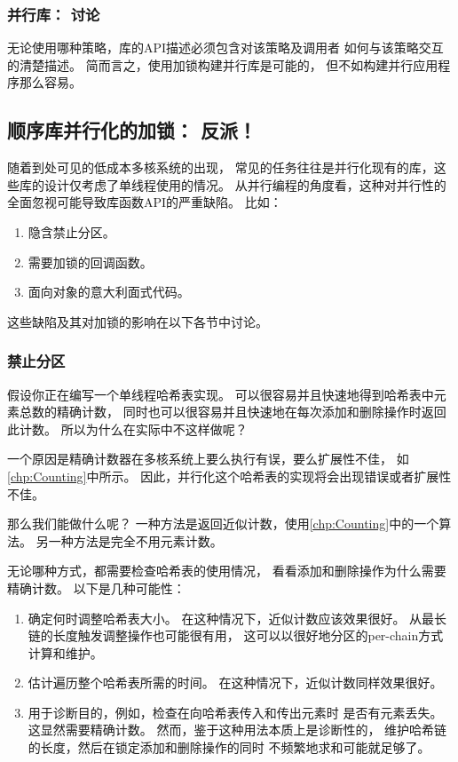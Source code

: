 \subsubsection{并行库：
				   讨论}
\label{sec:locking:Parallel Libraries: Discussion}

无论使用哪种策略，库的API描述必须包含对该策略及调用者
如何与该策略交互的清楚描述。
简而言之，使用加锁构建并行库是可能的，
但不如构建并行应用程序那么容易。

\subsection{顺序库并行化的加锁：
							    反派！}
\label{sec:locking:Locking For Parallelizing Sequential Libraries: Villain!}

随着到处可见的低成本多核系统的出现，
常见的任务往往是并行化现有的库，这些库的设计仅考虑了单线程使用的情况。
从并行编程的角度看，这种对并行性的全面忽视可能导致库函数API的严重缺陷。
比如：

\begin{enumerate}
\item	隐含禁止分区。
\item	需要加锁的回调函数。
\item	面向对象的意大利面式代码。
\end{enumerate}

这些缺陷及其对加锁的影响在以下各节中讨论。

\subsubsection{禁止分区}
\label{sec:locking:Partitioning Prohibited}

假设你正在编写一个单线程哈希表实现。
可以很容易并且快速地得到哈希表中元素总数的精确计数，
同时也可以很容易并且快速地在每次添加和删除操作时返回此计数。
所以为什么在实际中不这样做呢？

一个原因是精确计数器在多核系统上要么执行有误，要么扩展性不佳，
如\cref{chp:Counting}中所示。
因此，并行化这个哈希表的实现将会出现错误或者扩展性不佳。

那么我们能做什么呢？
一种方法是返回近似计数，使用\cref{chp:Counting}中的一个算法。
另一种方法是完全不用元素计数。

无论哪种方式，都需要检查哈希表的使用情况，
看看添加和删除操作为什么需要精确计数。
以下是几种可能性：

\begin{enumerate}
\item	确定何时调整哈希表大小。
	在这种情况下，近似计数应该效果很好。
	从最长链的长度触发调整操作也可能很有用，
	这可以以很好地分区的per-chain方式计算和维护。
\item	估计遍历整个哈希表所需的时间。
	在这种情况下，近似计数同样效果很好。
\item	用于诊断目的，例如，检查在向哈希表传入和传出元素时
	是否有元素丢失。
	这显然需要精确计数。
	然而，鉴于这种用法本质上是诊断性的，
	维护哈希链的长度，然后在锁定添加和删除操作的同时
	不频繁地求和可能就足够了。
\end{enumerate}

